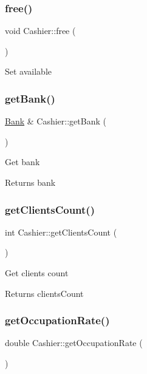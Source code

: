 \subsubsection{\texorpdfstring{free()}{free()}}
{\footnotesize\ttfamily void Cashier\+::free (\begin{DoxyParamCaption}{ }\end{DoxyParamCaption})}

Set available \mbox{\label{classCashier_aa60d8270fa27302302b80a810c53a8f9}} 
\subsubsection{\texorpdfstring{get\+Bank()}{getBank()}}
{\footnotesize\ttfamily \hyperlink{classBank}{Bank} \& Cashier\+::get\+Bank (\begin{DoxyParamCaption}{ }\end{DoxyParamCaption})}

Get bank \begin{DoxyReturn}{Returns}
bank 
\end{DoxyReturn}
\mbox{\label{classCashier_a50d3d5779132b3806958d0e57aea7a34}} 
\subsubsection{\texorpdfstring{get\+Clients\+Count()}{getClientsCount()}}
{\footnotesize\ttfamily int Cashier\+::get\+Clients\+Count (\begin{DoxyParamCaption}{ }\end{DoxyParamCaption})}

Get clients count \begin{DoxyReturn}{Returns}
clients\+Count 
\end{DoxyReturn}
\mbox{\label{classCashier_ac0c91ebe2a9ca9428537e79b82bfbe9f}} 
\subsubsection{\texorpdfstring{get\+Occupation\+Rate()}{getOccupationRate()}}
{\footnotesize\ttfamily double Cashier\+::get\+Occupation\+Rate (\begin{DoxyParamCaption}{ }\end{DoxyParamCaption})}


